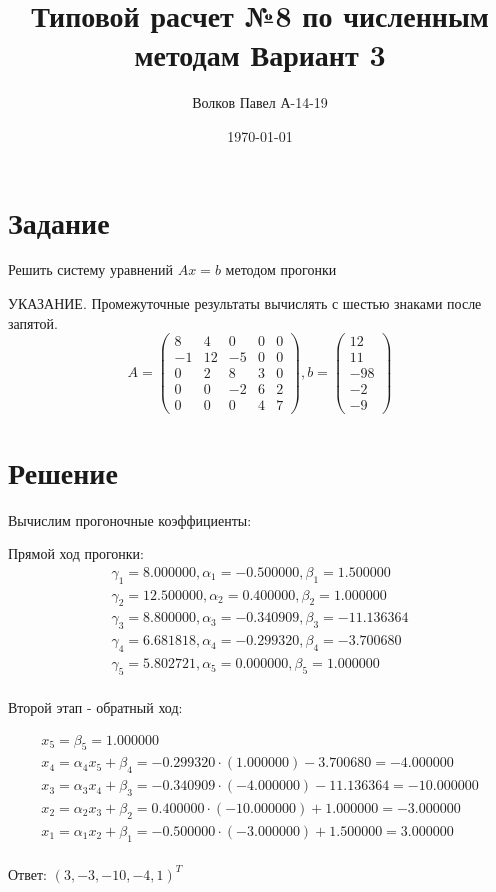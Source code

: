\documentclass[a4paper,12pt]{report} %
\author{Волков Павел А-14-19}
\title{Типовой расчет №8 по численным методам Вариант 3}
\date{\today}
\begin{document}

\maketitle

\newpage
\section*{Задание}
Решить систему уравнений $Ax = b$ методом прогонки

УКАЗАНИЕ. Промежуточные результаты вычислять с шестью знаками после запятой.
\[
	A = 
	\begin{pmatrix}
		8 & 4 & 0 & 0 & 0 \\
		-1 & 12 & -5 & 0 & 0 \\
		0 & 2 & 8 & 3 & 0 \\
		0 & 0 & -2 & 6 & 2 \\
		0 & 0 & 0 & 4 & 7
	\end{pmatrix}, b = 
	\begin {pmatrix}
		12 \\ 11 \\ -98 \\ -2 \\ -9
	\end{pmatrix}
\]

\section*{Решение}
Вычислим прогоночные коэффициенты:

Прямой ход прогонки:
\begin{gather*}
	\gamma_1 = 8.000000, \alpha_1 = -0.500000, \beta_1 = 1.500000 \\
	\gamma_2 = 12.500000, \alpha_2 = 0.400000, \beta_2 = 1.000000 \\
	\gamma_3 = 8.800000, \alpha_3 = -0.340909, \beta_3 = -11.136364 \\
	\gamma_4 = 6.681818, \alpha_4 = -0.299320, \beta_4 = -3.700680 \\
	\gamma_5 = 5.802721, \alpha_5 = 0.000000, \beta_5 = 1.000000 \\
\end{gather*}

Второй этап - обратный ход:

\begin{gather*}
	x_5 = \beta_5 = 1.000000 \\
	x_4 = \alpha_4 x_5 + \beta_4 = -0.299320 \cdot (1.000000) -3.700680 = -4.000000 \\
	x_3 = \alpha_3 x_4 + \beta_3 = -0.340909 \cdot (-4.000000) - 11.136364 = -10.000000 \\
	x_2 = \alpha_2 x_3 + \beta_2 = 0.400000 \cdot (-10.000000) + 1.000000 = -3.000000 \\
	x_1 = \alpha_1 x_2 + \beta_1 = -0.500000 \cdot (-3.000000) + 1.500000 = 3.000000 \\
\end{gather*}

Ответ: $(3, -3, -10, -4, 1)^T$
\end{document}

